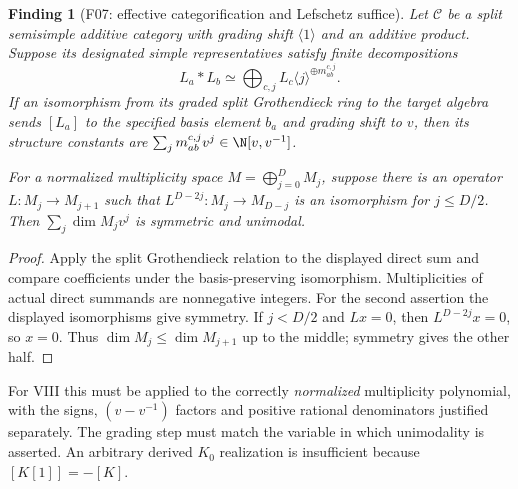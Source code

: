 \documentclass[11pt,a4paper]{article}
\newcommand{\mathscr}{\mathcal}
\newcommand{\fid}[1]{\textsf{#1}}\newcommand{\gate}[1]{\textsf{#1}}
\theoremstyle{named}\newtheorem{finding}{Finding}[section]
\theoremstyle{definition}\newtheorem{definition}[finding]{Definition}
\theoremstyle{remark}\newtheorem{remark}[finding]{Remark}
\begin{document}
\begin{finding}[\fid{F07}: effective categorification and Lefschetz suffice]\label{f:category}
Let $\mathscr C$ be a split semisimple additive category with grading shift $\langle1\rangle$ and an additive product. Suppose its designated simple representatives satisfy finite decompositions
\[
 L_a*L_b\simeq\bigoplus_{c,j}L_c\langle j\rangle^{\oplus m_{ab}^{c,j}}.
\]
If an isomorphism from its graded split Grothendieck ring to the target algebra sends $[L_a]$ to the \emph{specified} basis element $b_a$ and grading shift to $v$, then its structure constants are
$\sum_jm_{ab}^{c,j}v^j\in\N[v,v^{-1}]$.

For a normalized multiplicity space $M=\bigoplus_{j=0}^D M_j$, suppose there is an operator $L:M_j\to M_{j+1}$ such that
$L^{D-2j}:M_j\to M_{D-j}$ is an isomorphism for $j\le D/2$. Then $\sum_j\dim M_jv^j$ is symmetric and unimodal.
\end{finding}
\begin{proof}
Apply the split Grothendieck relation to the displayed direct sum and compare coefficients under the basis-preserving isomorphism. Multiplicities of actual direct summands are nonnegative integers. For the second assertion the displayed isomorphisms give symmetry. If $j<D/2$ and $Lx=0$, then $L^{D-2j}x=0$, so $x=0$. Thus $\dim M_j\le\dim M_{j+1}$ up to the middle; symmetry gives the other half.
\end{proof}
For VIII this must be applied to the correctly \emph{normalized} multiplicity polynomial, with the signs, $(v-v^{-1})$ factors and positive rational denominators justified separately. The grading step must match the variable in which unimodality is asserted. An arbitrary derived $K_0$ realization is insufficient because $[K[1]]=-[K]$.
\end{document}

